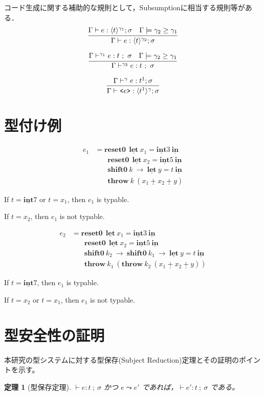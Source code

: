 \documentclass[T]{compsoft}
\newcommand\Resetz{\textbf{reset0}}
\newcommand\Shiftz{\textbf{shift0}}
\newcommand\Throw{\textbf{throw}}
\newcommand\cPlus{\underline{\textbf{+}}}
\newcommand\cLet{\underline{\textbf{let}}}
\newcommand\cIn{\underline{\textbf{in}}}
\newcommand\cint{\underline{\textbf{int}}}
\newcommand\code[1]{\texttt{<}{#1}\texttt{>}}
\newcommand\codeT[2]{\langle{#1}\rangle^{#2}}
\newcommand\ord{\ge}
\newcommand\lto{\leadsto}
\theoremstyle{break}
\newtheorem{theo}{定理}[section]
\begin{document}
コード生成に関する補助的な規則として，Subsumptionに相当する規則等がある．
\[
  \infer
  {\Gamma \vdash e : \codeT{t}{\gamma_2} ; \sigma}
  {\Gamma \vdash e : \codeT{t}{\gamma_1} ; \sigma
    & \Gamma \models \gamma_2 \ord \gamma_1
  }
\]

\[
  \infer
  {\Gamma \vdash^{\gamma_2} e : t ~;~ \sigma}
  {\Gamma \vdash^{\gamma_1} e : t ~;~ \sigma
    & \Gamma \models \gamma_2 \ord \gamma_1
  }
\]


\[
  \infer
  {\Gamma \vdash \code{e} : \codeT{t^1}{\gamma} ; \sigma}
  {\Gamma \vdash^{\gamma} e : t^1 ; \sigma}
\]


\section{型付け例}

\begin{align*}
  e_1 & = \Resetz ~~\cLet~x_1=\cint{3}~\cIn \\
      & \phantom{=}~~ \Resetz ~~\cLet~x_2=\cint{5}~\cIn \\
      & \phantom{=}~~ \Shiftz~k~\to~\cLet~y=t~\cIn \\
      & \phantom{=}~~ \Throw~k~(x_1~\cPlus~x_2~\cPlus~y)
\end{align*}

If $t=\cint{7}$ or $t=x_1$, then $e_1$ is typable.

If $t=x_2$, then $e_1$ is not typable.

\begin{align*}
  e_2 & = \Resetz ~~\cLet~x_1=\cint{3}~\cIn \\
      & \phantom{=}~~ \Resetz ~~\cLet~x_2=\cint{5}~\cIn \\
      & \phantom{=}~~ \Shiftz~k_2~\to~ \Shiftz~k_1~\to~ \cLet~y=t~\cIn \\
      & \phantom{=}~~ \Throw~k_1~(\Throw~k_2~(x_1~\cPlus~x_2~\cPlus~y))
\end{align*}

If $t=\cint{7}$, then $e_1$ is typable.

If $t=x_2$ or $t=x_1$, then $e_1$ is not typable.

\section{型安全性の証明}

本研究の型システムに対する型保存(Subject Reduction)定理とその証明のポイントを示す。

\begin{theo}[型保存定理]
  $\vdash e:t~;~\sigma$ かつ $e \lto e'$ であれば，$\vdash e':t~;~\sigma$ である。
\end{theo}
\end{document}
